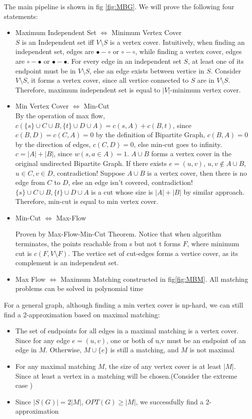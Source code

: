 The main pipeline is shown in fig \ref{fig:MBG}. We will prove the following four statements:
\begin{itemize}
    \item Maximum Independent Set $\Leftrightarrow$ Minimum Vertex Cover\\
    $S$ is an Independent set iff $V\setminus S$ is a vertex cover. Intuitively, when finding an independent set, edges are $\bullet -\circ$ or $\circ - \circ$, while finding a vertex cover, edges are $\circ - \bullet $ or $\bullet - \bullet$. For every edge in an independent set $S$, at least one of its endpoint must be in $V\setminus S$, else an edge exists between vertice in $S$.  Consider $V \setminus S$, it forms a vertex cover, since all vertice connected to $S$ are in $V\setminus S$.
    Therefore, maximum independent set is equal to $|V|$-minimum vertex cover.

    \item Min Vertex Cover $\Leftrightarrow$ Min-Cut\\
    By the operation of max flow, $c(\{s\}\cup C\cup B, \{t\}\cup D\cup A)=c(s,A)+c(B,t)$, since $c(B,D)=c(C,A)=0$ by the definition of Bipartite Graph, $c(B,A)=0$ by the direction of edges, $c(C,D)=0$, else min-cut goes to infinity. $c=|A|+|B|$, since $w(s,a\in A)=1$. $A\cup B$ forms a vertex cover in the original undirected Bipartite Graph. If there exists $e=(u,v)$, $u,v \notin A \cup B$, $u\in C, v \in D$, contradiction!
    Suppose $A\cup B$ is a vertex cover, then there is no edge from $C$ to $D$, else an edge isn't covered, contradiction! $\{s\}\cup C\cup B, \{t\}\cup D\cup A$ is a cut whose size is $|A|+|B|$ by similar approach. Therefore, min-cut is equal to min vertex cover.
    \item Min-Cut $\Leftrightarrow$ Max-Flow
    
    Proven by Max-Flow-Min-Cut Theorem. Notice that when algorithm terminates, the points reachable from s but not t forms $F$, where minimum cut is $c(F, V\setminus F)$. The vertice set of cut-edges forms a vertice cover, as its complement is an independent set. 
    \item Max Flow $\Leftrightarrow$ Maximum Matching
    constructed in fig\ref{fig:MBM}.
    All matching problems can be solved in polynomial time
\end{itemize}

For a general graph, although finding a min vertex cover is np-hard, we can still find a 2-approximation based on maximal matching:
\begin{itemize}
    \item The set of endpoints for all edges in a maximal matching is
    a vertex cover.\\
    Since for any edge $e=(u,v)$, one or both of u,v must be an endpoint of an edge in $M$. Otherwise, $M \cup \{e\}$ is still a matching, and  $M$ is not maximal
    \item For any maximal matching $M$, the size of any vertex cover is at least $|M|$.\\
    Since at least a vertex in a matching will be chosen.(Consider the extreme case )
    \item Since $|S(G)|=2|M|$, $OPT(G)\geq |M|$, we successfully find a 2-approximation
\end{itemize}